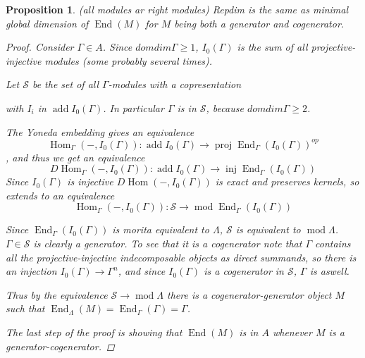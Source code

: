 \documentclass[11pt, a4paper, english]{article}
\newtheorem{prop}[theorem]{Proposition}
\theoremstyle{definition}
\DeclareMathOperator{\Hom}{Hom}
\DeclareMathOperator{\End}{End}
\DeclareMathOperator{\inj}{inj}
\DeclareMathOperator{\proj}{proj}
\DeclareMathOperator{\add}{add}
\def\mod{\operatorname{mod}}
\begin{document}
\begin{prop}\label{prop:repdim_auslander_generator} 
	(all modules ar right modules)
	Repdim is the same as minimal global dimension of $\End(M)$ for $M$ being both a generator and cogenerator. 
	\begin{proof}
		Consider $\Gamma \in A$. Since $domdim\Gamma \geq 1$, $I_0(\Gamma)$ is the sum of all projective-injective modules (some probably several times). 
		
		Let $\mathcal S$ be the set of all $\Gamma$-modules with a copresentation
		\begin{center}
		\end{center}
		with $I_i$ in $\add I_0(\Gamma)$. In particular $\Gamma$ is in $\mathcal S$, because $domdim\Gamma \geq 2$.
		
		The Yoneda embedding gives an equivalence $$\Hom_\Gamma(-,I_0(\Gamma)):\add I_0(\Gamma) \to \proj\End_\Gamma(I_0(\Gamma))^{op}$$, and thus we get an equivalence $$D\Hom_\Gamma(-,I_0(\Gamma)):\add I_0(\Gamma) \to \inj\End_\Gamma(I_0(\Gamma))$$
		Since $I_0(\Gamma)$ is injective $D\Hom(-,I_0(\Gamma))$ is exact and preserves kernels, so extends to an equivalence
		$$\Hom_\Gamma(-,I_0(\Gamma)):\mathcal S \to \mod \End_\Gamma(I_0(\Gamma))$$
		
		Since $\End_\Gamma(I_0(\Gamma))$ is morita equivalent to $\Lambda$, $\mathcal S$ is equivalent to $\mod \Lambda$. $\Gamma \in \mathcal S$ is clearly a generator. To see that it is a cogenerator note that $\Gamma$ contains all the projective-injective indecomposable objects as direct summands, so there is an injection $I_0(\Gamma) \to \Gamma^n$, and since $I_0(\Gamma)$ is a cogenerator in $\mathcal S$, $\Gamma$ is aswell.
		
		Thus by the equivalence $\mathcal S \to \mod\Lambda$ there is a cogenerator-generator object $M$ such that $\End_\Lambda(M) = \End_\Gamma(\Gamma)=\Gamma$.
		
		The last step of the proof is showing that $\End(M)$ is in $A$ whenever $M$ is a generator-cogenerator.
		

\end{proof}
\end{prop}
\end{document}
